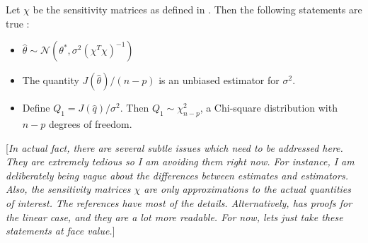 \documentclass[10pt]{article}
\begin{document}
Let $\chi$ be the sensitivity matrices as defined in \cite{BanksTran}.  Then the following statements are true \cite[Sec. 1.3]{Gallant}:
\begin{itemize}
\item $\hat{\theta} \sim \mathcal{N}(\theta^{*},\sigma^{2}(\chi^{T}\chi)^{-1})$
\item The quantity $J(\hat{\theta})/(n-p)$ is an unbiased estimator for $\sigma^{2}$.
\item Define $Q_{1} = J(\hat{q})/\sigma^{2}$.  Then $Q_{1} \sim \chi^{2}_{n-p}$, a Chi-square distribution with $n-p$ degrees of freedom.
\end{itemize}
[\emph{In actual fact, there are several subtle issues which need to be addressed here.  They are extremely tedious so I am avoiding them right now.  For instance, I am deliberately being vague about the differences between estimates and estimators.  Also, the sensitivity matrices $\chi$ are only approximations to the actual quantities of interest.  The references \cite{BanksFitzpatrick,Gallant} have most of the details.  Alternatively, \cite{SeberLee} has proofs for the linear case, and they are a lot more readable.  For now, lets just take these statements at face value.}]
\end{document}
